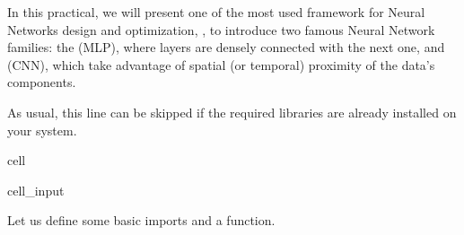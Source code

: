 \documentclass[letterpaper,10pt,english]{jupyterBook}
\begin{document}
\sphinxAtStartPar
In this practical, we will present one of the most used framework for Neural Networks design and optimization, , to introduce two famous Neural Network families: the  (MLP), where layers are densely connected with the next one, and  (CNN), which take advantage of spatial (or temporal) proximity of the data’s components.

\begin{sphinxShadowBox}
\sphinxstylesidebartitle{}

\sphinxAtStartPar
As usual, this line can be skipped if the required libraries are already installed on your system.
\end{sphinxShadowBox}

\begin{sphinxuseclass}{cell}\begin{sphinxVerbatimInput}

\begin{sphinxuseclass}{cell_input}
\begin{sphinxVerbatim}[commandchars=\\\{\}]
\end{sphinxVerbatim}

\end{sphinxuseclass}\end{sphinxVerbatimInput}

\end{sphinxuseclass}
\sphinxAtStartPar
Let us define some basic imports and a  function.
\end{document}

